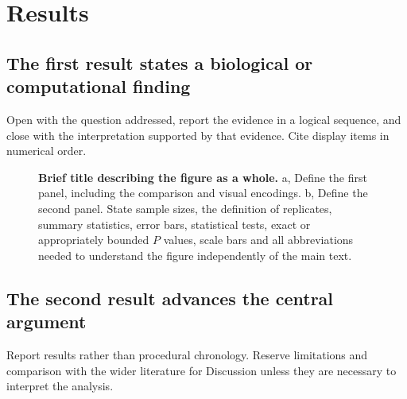 \section*{Results}

\subsection*{The first result states a biological or computational finding}

Open with the question addressed, report the evidence in a logical sequence, and close with the interpretation supported by that evidence. Cite display items in numerical order.

\begin{figure}[htbp]
  \centering
  \caption{\textbf{Brief title describing the figure as a whole.} a, Define the first panel, including the comparison and visual encodings. b, Define the second panel. State sample sizes, the definition of replicates, summary statistics, error bars, statistical tests, exact or appropriately bounded $P$ values, scale bars and all abbreviations needed to understand the figure independently of the main text.}
  \label{fig:figure1}
\end{figure}

\subsection*{The second result advances the central argument}

Report results rather than procedural chronology. Reserve limitations and comparison with the wider literature for Discussion unless they are necessary to interpret the analysis.
